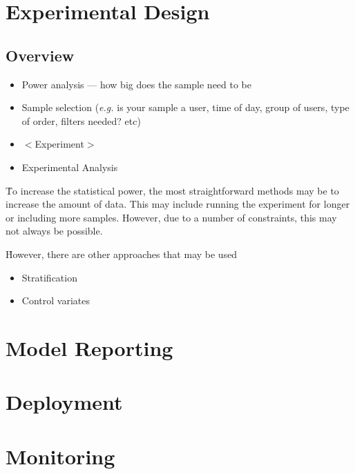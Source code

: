 
\chapter{Experimental Design}

\section{Overview}



\begin{itemize}[noitemsep,topsep=0pt]
	\item Power analysis --- how big does the sample need to be \ALR
	\item Sample selection (\textit{e.g.} is your sample a user, time of day, group of users, type of order, filters needed? etc) \ALR
	\item $<$Experiment$>$
	\item Experimental Analysis \ALR
\end{itemize}


\r{To increase the statistical power, the most straightforward methods may be to increase the amount of data. This may include running the experiment for longer or including more samples. However, due to a number of constraints, this may not always be possible.}

\r{However, there are other approaches that may be used}

\begin{itemize}[noitemsep,topsep=0pt]
	\item Stratification \ALR
	\item Control variates \ALR
\end{itemize}


\chapter{Model Reporting}


\chapter{Deployment}


\chapter{Monitoring}


